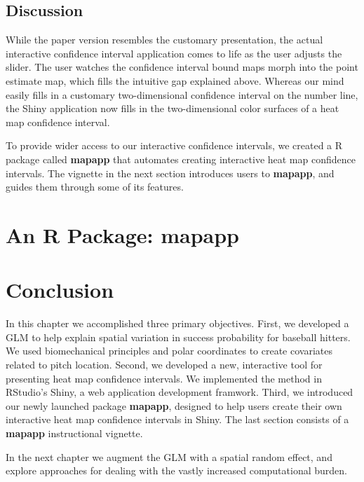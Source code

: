 \subsection{Discussion}

While the paper version resembles the customary presentation, the actual interactive confidence interval application comes to life as the user adjusts the slider. The user watches the confidence interval bound maps morph into the point estimate map, which fills the intuitive gap explained above. Whereas our mind easily fills in a customary two-dimensional confidence interval on the number line, the Shiny application now fills in the two-dimensional color surfaces of a heat map confidence interval.

To provide wider access to our interactive confidence intervals, we created a R package called {\bf mapapp} that automates creating interactive heat map confidence intervals. The vignette in the next section introduces users to {\bf mapapp}, and guides them through some of its features. 

\section{ An R Package: {\bf mapapp}}

\section{Conclusion}

In this chapter we accomplished three primary objectives. First, we developed a GLM to help explain spatial variation in success probability for baseball hitters. We used biomechanical principles and polar coordinates to create covariates related to pitch location. Second, we developed a new, interactive tool for presenting heat map confidence intervals. We implemented the method in RStudio's Shiny, a web application development framwork. Third, we introduced our newly launched package {\bf mapapp}, designed to help users create their own interactive heat map confidence intervals in Shiny. The last section consists of a {\bf mapapp} instructional vignette.

In the next chapter we augment the GLM with a spatial random effect, and explore approaches for dealing with the vastly increased computational burden.

